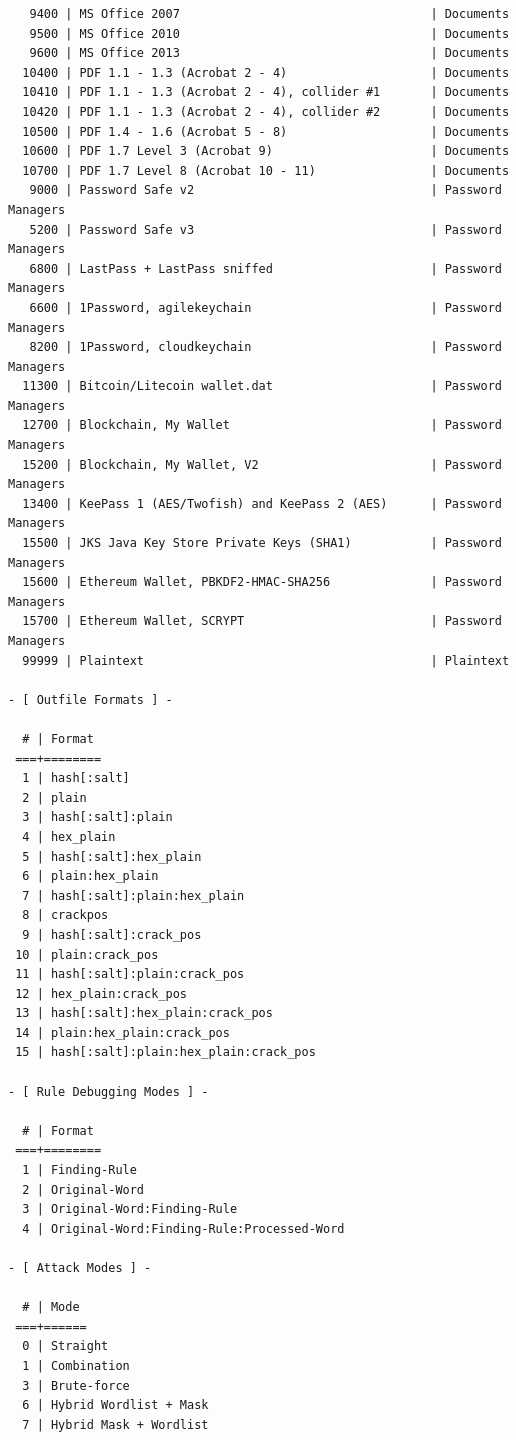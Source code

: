 \documentclass{article}
\begin{document}
\begin{lstlisting}
   9400 | MS Office 2007                                   | Documents
   9500 | MS Office 2010                                   | Documents
   9600 | MS Office 2013                                   | Documents
  10400 | PDF 1.1 - 1.3 (Acrobat 2 - 4)                    | Documents
  10410 | PDF 1.1 - 1.3 (Acrobat 2 - 4), collider #1       | Documents
  10420 | PDF 1.1 - 1.3 (Acrobat 2 - 4), collider #2       | Documents
  10500 | PDF 1.4 - 1.6 (Acrobat 5 - 8)                    | Documents
  10600 | PDF 1.7 Level 3 (Acrobat 9)                      | Documents
  10700 | PDF 1.7 Level 8 (Acrobat 10 - 11)                | Documents
   9000 | Password Safe v2                                 | Password Managers
   5200 | Password Safe v3                                 | Password Managers
   6800 | LastPass + LastPass sniffed                      | Password Managers
   6600 | 1Password, agilekeychain                         | Password Managers
   8200 | 1Password, cloudkeychain                         | Password Managers
  11300 | Bitcoin/Litecoin wallet.dat                      | Password Managers
  12700 | Blockchain, My Wallet                            | Password Managers
  15200 | Blockchain, My Wallet, V2                        | Password Managers
  13400 | KeePass 1 (AES/Twofish) and KeePass 2 (AES)      | Password Managers
  15500 | JKS Java Key Store Private Keys (SHA1)           | Password Managers
  15600 | Ethereum Wallet, PBKDF2-HMAC-SHA256              | Password Managers
  15700 | Ethereum Wallet, SCRYPT                          | Password Managers
  99999 | Plaintext                                        | Plaintext

- [ Outfile Formats ] -

  # | Format
 ===+========
  1 | hash[:salt]
  2 | plain
  3 | hash[:salt]:plain
  4 | hex_plain
  5 | hash[:salt]:hex_plain
  6 | plain:hex_plain
  7 | hash[:salt]:plain:hex_plain
  8 | crackpos
  9 | hash[:salt]:crack_pos
 10 | plain:crack_pos
 11 | hash[:salt]:plain:crack_pos
 12 | hex_plain:crack_pos
 13 | hash[:salt]:hex_plain:crack_pos
 14 | plain:hex_plain:crack_pos
 15 | hash[:salt]:plain:hex_plain:crack_pos

- [ Rule Debugging Modes ] -

  # | Format
 ===+========
  1 | Finding-Rule
  2 | Original-Word
  3 | Original-Word:Finding-Rule
  4 | Original-Word:Finding-Rule:Processed-Word

- [ Attack Modes ] -

  # | Mode
 ===+======
  0 | Straight
  1 | Combination
  3 | Brute-force
  6 | Hybrid Wordlist + Mask
  7 | Hybrid Mask + Wordlist


\end{lstlisting}
\end{document}
